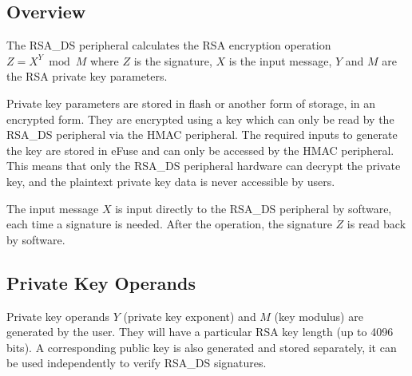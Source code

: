 \documentclass[main\_\_EN.tex]{subfiles}
\begin{document}
\subsection{Overview}

The RSA\_DS peripheral calculates the RSA encryption operation \begin{math}Z = X^{Y} \bmod M\end{math} where \begin{math}Z\end{math} is the signature, \begin{math}X\end{math} is the input message, \begin{math}Y\end{math} and \begin{math}M\end{math} are the RSA private key parameters.

Private key parameters are stored in flash or another form of storage, in an encrypted form. They are encrypted using a key which can only be read by the RSA\_DS peripheral via the HMAC peripheral. The required inputs to generate the key are stored in eFuse and can only be accessed by the HMAC peripheral. This means that only the RSA\_DS peripheral hardware can decrypt the private key, and the plaintext private key data is never accessible by users.

The input message \begin{math}X\end{math} is input directly to the RSA\_DS peripheral by software, each time a signature is needed. After the operation, the signature \begin{math}Z\end{math} is read back by software.


\subsection{Private Key Operands}\label{Private Key Operands}


Private key operands \begin{math}Y\end{math} (private key exponent) and \begin{math}M\end{math} (key modulus) are generated by the user. They will have a particular RSA key length (up to 4096 bits). A corresponding public key is also generated and stored separately, it can be used independently to verify RSA\_DS signatures.
\end{document}
